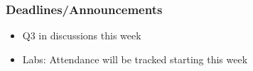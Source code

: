 
\begin{frame}
    \frametitle{Deadlines/Announcements}
\begin{itemize}
            \item Q3 in discussions this week
            \item Labs: Attendance will be tracked starting this week
        \end{itemize}
\end{frame}
